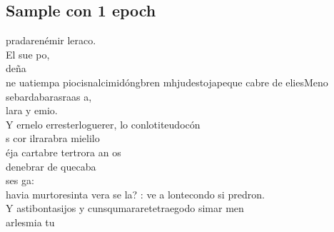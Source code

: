 \documentclass[11pt,letterpaper]{article}
\begin{document}
\subsection{Sample con 1 epoch}
\begin{center}
\parbox{0.5\linewidth}{
pradarenémir leraco.\\
El sue po,\\
deña\\
ne uatiempa piocisnalcimidóngbren mhjudestojapeque cabre de eliesMeno\\
sebardabarasraas a,\\
lara y emio.\\

Y ernelo erresterloguerer, lo conlotiteudocón\\
s cor ilrarabra mielilo\\
éja cartabre tertrora an os\\
denebrar de quecaba\\
ses ga:\\
havia murtoresinta vera se la? : ve a lontecondo si predron.\\

Y astibontasijos y cunsqumararetetraegodo simar men\\
arlesmia tu
}
\end{center}
\end{document}
